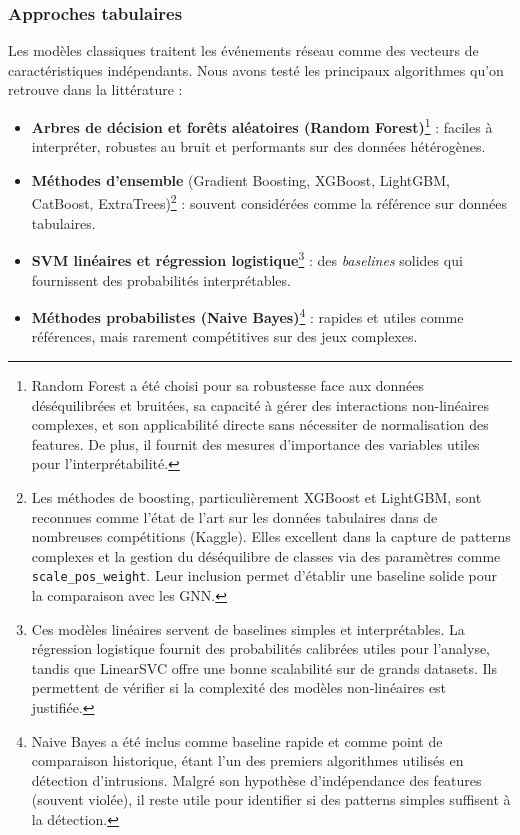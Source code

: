 ﻿\documentclass[11pt,a4paper]{article}
\begin{document}
\subsubsection{Approches tabulaires}

Les modèles classiques traitent les événements réseau comme des vecteurs de caractéristiques indépendants. Nous avons testé les principaux algorithmes qu'on retrouve dans la littérature :
\begin{itemize}
    \item \textbf{Arbres de décision et forêts aléatoires (Random Forest)}\footnote{Random Forest a été choisi pour sa robustesse face aux données déséquilibrées et bruitées, sa capacité à gérer des interactions non-linéaires complexes, et son applicabilité directe sans nécessiter de normalisation des features. De plus, il fournit des mesures d'importance des variables utiles pour l'interprétabilité.} : faciles à interpréter, robustes au bruit et performants sur des données hétérogènes.
    \item \textbf{Méthodes d'ensemble} (Gradient Boosting, XGBoost, LightGBM, CatBoost, ExtraTrees)\footnote{Les méthodes de boosting, particulièrement XGBoost et LightGBM, sont reconnues comme l'état de l'art sur les données tabulaires dans de nombreuses compétitions (Kaggle). Elles excellent dans la capture de patterns complexes et la gestion du déséquilibre de classes via des paramètres comme \texttt{scale\_pos\_weight}. Leur inclusion permet d'établir une baseline solide pour la comparaison avec les GNN.} : souvent considérées comme la référence sur données tabulaires.
    \item \textbf{SVM linéaires et régression logistique}\footnote{Ces modèles linéaires servent de baselines simples et interprétables. La régression logistique fournit des probabilités calibrées utiles pour l'analyse, tandis que LinearSVC offre une bonne scalabilité sur de grands datasets. Ils permettent de vérifier si la complexité des modèles non-linéaires est justifiée.} : des \emph{baselines} solides qui fournissent des probabilités interprétables.
    \item \textbf{Méthodes probabilistes (Naive Bayes)}\footnote{Naive Bayes a été inclus comme baseline rapide et comme point de comparaison historique, étant l'un des premiers algorithmes utilisés en détection d'intrusions. Malgré son hypothèse d'indépendance des features (souvent violée), il reste utile pour identifier si des patterns simples suffisent à la détection.} : rapides et utiles comme références, mais rarement compétitives sur des jeux complexes.
\end{itemize}
\end{document}
